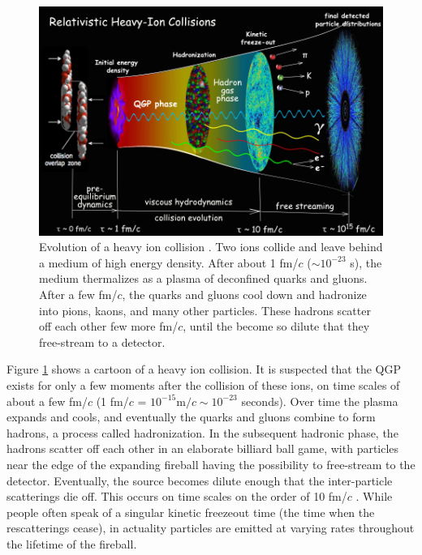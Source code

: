 \begin{figure}[hbt]
\includegraphics[width=36pc]{Figures/BorrowedFigures/HeavyIonEvolution.pdf}
\caption[Evolution of a heavy ion collision]{Evolution of a heavy ion collision \cite{Shen:2015msa}. 
Two ions collide and leave behind a medium of high energy density. 
After about 1 fm/$c$ ($\sim 10^{-23}$ s), the medium thermalizes as a plasma of deconfined quarks and gluons. 
After a few fm/$c$, the quarks and gluons cool down and hadronize into pions, kaons, and many other particles. These hadrons scatter off each other few more fm/$c$, until the become so dilute that they free-stream to a detector.}
\label{fig:HeavyIonEvolution}
\end{figure}


Figure \ref{fig:HeavyIonEvolution} shows a cartoon of a heavy ion collision.
It is suspected that the QGP exists for only a few moments after the collision of these ions, on time scales of about a few fm/$c$ (1 fm/$c$ = $10^{-15} \mathrm{m}/c \sim 10^{-23}$ seconds).
Over time the plasma expands and cools, and eventually the quarks and gluons combine to form hadrons, a process called hadronization.
In the subsequent hadronic phase, the hadrons scatter off each other in an elaborate billiard ball game, with particles near the edge of the expanding fireball having the possibility to free-stream to the detector.
Eventually, the source becomes dilute enough that the inter-particle scatterings die off. This occurs on time scales on the order of 10 fm/$c$ \cite{BraunMunzinger:2007zz}.
While people often speak of a singular kinetic freezeout time (the time when the rescatterings cease), in actuality particles are emitted at varying rates throughout the lifetime of the fireball.


